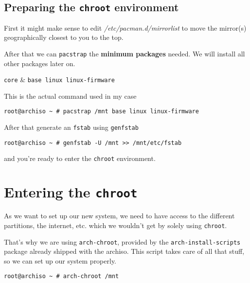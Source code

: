 \documentclass[10pt]{dustdoc}
\begin{document}
\section{Preparing the \texttt{chroot} environment}
\label{sec:preparing-the-chroot-environment}

First it might make sense to edit \textit{/etc/pacman.d/mirrorlist} to move the mirror(s) geographically closest to you to the top.

After that we can \texttt{pacstrap} the \textbf{minimum packages} needed.
We will install all other packages later on.

\begin{packagetable}
    \texttt{core} & \texttt{base linux linux-firmware} \\ 
\end{packagetable}

\begin{NOTE}
    This is the actual command used in my case

    \begin{verbatim}
root@archiso ~ # pacstrap /mnt base linux linux-firmware
    \end{verbatim}
\end{NOTE}

After that generate an \texttt{fstab} using \texttt{genfstab}

\begin{verbatim}
root@archiso ~ # genfstab -U /mnt >> /mnt/etc/fstab
\end{verbatim}

\noindent
and you’re ready to enter the \texttt{chroot} environment.

\chapter{Entering the \texttt{chroot}}
\label{sec:entering-the-chroot}

\begin{NOTE}
    As we want to set up our new system, we need to have access to the different partitions, the internet, etc. which we wouldn’t get by solely using \texttt{chroot}.

    That’s why we are using \texttt{arch-chroot}, provided by the \texttt{arch-install-scripts} package already shipped with the archiso.
    This script takes care of all that stuff, so we can set up our system properly.
\end{NOTE}

\begin{verbatim}
root@archiso ~ # arch-chroot /mnt
\end{verbatim}
\end{document}
